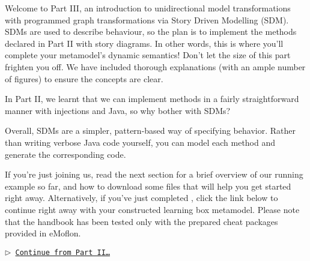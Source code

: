 \genHeader

Welcome to Part III, an introduction to unidirectional model transformations with programmed graph transformations via Story Driven Modelling (SDM).
SDMs are used to describe behaviour, so the plan is to implement the methods declared in Part II with story diagrams. In other words,
this is where you'll complete your metamodel's dynamic semantics! Don't let the 
size of this part frighten you off. We have included thorough
explanations (with an ample number of figures) to ensure the concepts are 
clear.

In Part II, we learnt that we can implement methods in a fairly straightforward manner with injections and Java, so why bother with SDMs?

Overall, SDMs are a simpler, pattern-based way of specifying behavior. Rather than writing verbose Java code yourself, you can model each method and generate
the corresponding code.

If you're just joining us, read the next section for a brief overview of our running example so far, and how to download some files that will help you get started right away.
Alternatively, if you've just completed , click the link below to continue right away with your constructed learning box metamodel.
Please note that the handbook has been tested only with the prepared cheat packages provided in eMoflon.


\begin{center}\texttt{$\triangleright$ \hyperlink{explanation}{Continue from Part II\ldots}}\end{center}
